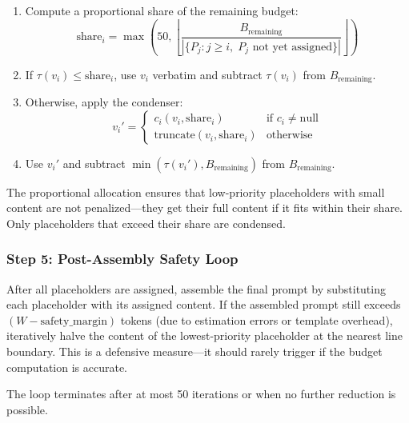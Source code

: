\documentclass[11pt]{article}
\begin{document}
\begin{enumerate}
  \item Compute a proportional share of the remaining budget:
    \begin{equation}
    \text{share}_i = \max\!\left(50, \left\lfloor \frac{B_{\text{remaining}}}{|\{P_j : j \geq i,\; P_j \text{ not yet assigned}\}|}\right\rfloor\right)
    \label{eq:share}
    \end{equation}

  \item If $\tau(v_i) \leq \text{share}_i$, use $v_i$ verbatim and
    subtract $\tau(v_i)$ from $B_{\text{remaining}}$.

  \item Otherwise, apply the condenser:
    \begin{equation}
    v_i' =
    \begin{cases}
    c_i(v_i, \text{share}_i) & \text{if } c_i \neq \text{null} \\
    \text{truncate}(v_i, \text{share}_i) & \text{otherwise}
    \end{cases}
    \label{eq:condense}
    \end{equation}

  \item Use $v_i'$ and subtract $\min(\tau(v_i'), B_{\text{remaining}})$
    from $B_{\text{remaining}}$.
\end{enumerate}

The proportional allocation ensures that low-priority placeholders
with small content are not penalized---they get their full content if
it fits within their share.  Only placeholders that exceed their share
are condensed.

\subsubsection{Step 5: Post-Assembly Safety Loop}

After all placeholders are assigned, assemble the final prompt by
substituting each placeholder with its assigned content.  If the
assembled prompt still exceeds $(W - \text{safety\_margin})$ tokens
(due to estimation errors or template overhead), iteratively halve
the content of the lowest-priority placeholder at the nearest line
boundary.  This is a defensive measure---it should rarely trigger if
the budget computation is accurate.

The loop terminates after at most 50 iterations or when no further
reduction is possible.
\end{document}
